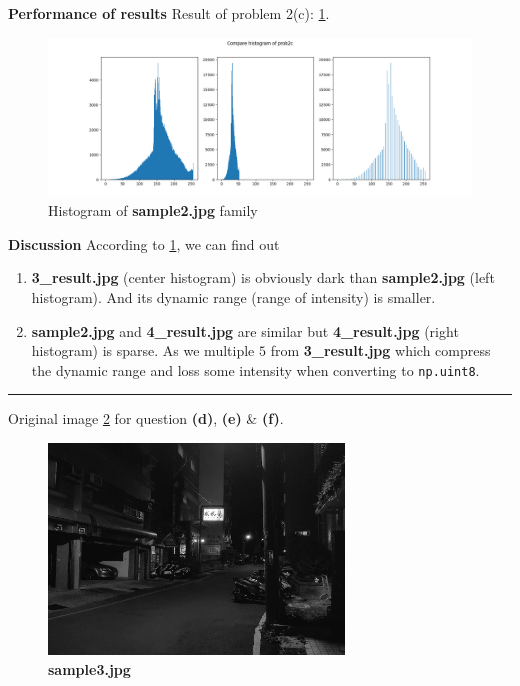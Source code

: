 \textbf{Performance of results}
Result of problem 2(c): \cref{fig2c}.
\begin{figure}
  \centering
  \includegraphics[width=\textwidth]{image/prob2c.png}
  \caption{Histogram of \textbf{sample2.jpg} family}
  \label{fig2c}
\end{figure}

\textbf{Discussion}
According to \cref{fig2c}, we can find out
\begin{enumerate}
\def\labelenumi{\arabic{enumi}.}
\tightlist
\item \textbf{3\_result.jpg} (center histogram) is obviously dark than \textbf{sample2.jpg} (left histogram). And its dynamic range (range of intensity) is smaller.
\item \textbf{sample2.jpg} and \textbf{4\_result.jpg} are similar but \textbf{4\_result.jpg} (right histogram) is \alert{sparse}. As we multiple \(5\) from \textbf{3\_result.jpg} which compress the dynamic range and loss some intensity when converting to \texttt{np.uint8}.
\end{enumerate}

\rule{\textwidth}{.5mm}
Original image \cref{fig2_1} for question \textbf{(d)}, \textbf{(e)} \& \textbf{(f)}.
\begin{figure}
    \centering
    \includegraphics[width=0.7\textwidth]{image/sample3.jpg}
    \caption{\textbf{sample3.jpg}}
    \label{fig2_1}
\end{figure}

